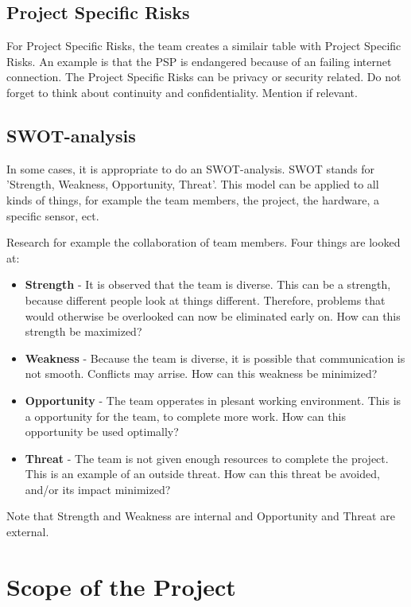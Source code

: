 \documentclass[10pt]{report}
\begin{document}
\subsection{Project Specific Risks}

For Project Specific Risks, the team creates a similair table with Project Specific Risks. An example is that the PSP is endangered because of an failing internet connection. The Project Specific Risks can be privacy or security related. Do not forget to think about continuity and confidentiality. Mention if relevant.

\subsection{SWOT-analysis}

In some cases, it is appropriate to do an SWOT-analysis. SWOT stands for 'Strength, Weakness, Opportunity, Threat'. This model can be applied to all kinds of things, for example the team members, the project, the hardware, a specific sensor, ect. 

Research for example the collaboration of team members. Four things are looked at:

\begin{itemize}
	\item \textbf{Strength} - It is observed that the team is diverse. This can be a strength, because different people look at things different. Therefore, problems that would otherwise be overlooked can now be eliminated early on. How can this strength be maximized?
	\item \textbf{Weakness} - Because the team is diverse, it is possible that communication is not smooth. Conflicts may arrise. How can this weakness be minimized?
	\item \textbf{Opportunity} - The team opperates in plesant working environment. This is a opportunity for the team, to complete more work. How can this opportunity be used optimally?
	\item \textbf{Threat} - The team is not given enough resources to complete the project. This is an example of an outside threat. How can this threat be avoided, and/or its impact minimized?
\end{itemize}

Note that Strength and Weakness are internal and Opportunity and Threat are external.

\newpage

\section{Scope of the Project}
\end{document}
